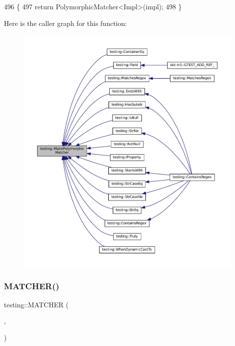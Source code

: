 \begin{DoxyCode}
496                                                                          \{
497   \textcolor{keywordflow}{return} PolymorphicMatcher<Impl>(impl);
498 \}
\end{DoxyCode}
Here is the caller graph for this function\+:
\nopagebreak
\begin{figure}[H]
\begin{center}
\leavevmode
\includegraphics[width=350pt]{namespacetesting_a667ca94f190ec2e17ee2fbfdb7d3da04_icgraph}
\end{center}
\end{figure}
\mbox{\label{namespacetesting_a4fcb3f407119590471bea5a90a8d2dda}} 
\subsubsection{\texorpdfstring{M\+A\+T\+C\+H\+E\+R()}{MATCHER()}}
{\footnotesize\ttfamily testing\+::\+M\+A\+T\+C\+H\+ER (\begin{DoxyParamCaption}\item[{Is\+Empty}]{,  }\item[{negation ? \char`\"{}isn\textquotesingle{}t empty\char`\"{} \+:\char`\"{}is empty\char`\"{}}]{ }\end{DoxyParamCaption})}



